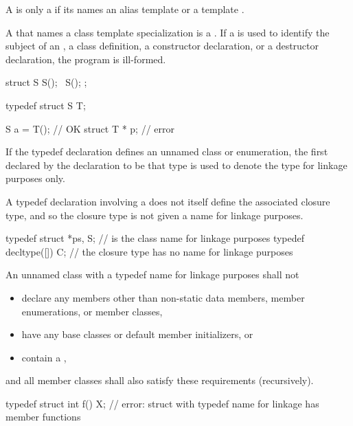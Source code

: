 \pnum
{}%
A  is only a 
if its  names
an alias template or a template .
\begin{note}
A  that names a class template specialization
is a .
If a  is used to identify the subject of an
, a class
definition, a constructor
declaration, or a destructor
declaration, the program is ill-formed.
\end{note}
\begin{example}
\begin{codeblock}
struct S {
  S();
  ~S();
};

typedef struct S T;

S a = T();                      // OK
struct T * p;                   // error
\end{codeblock}
\end{example}

\pnum
{}%
%
%
If the typedef declaration defines an unnamed class or enumeration, the first
 declared by the declaration to be that type
is used to denote the type for linkage purposes only.
\begin{note}
A typedef declaration involving a 
does not itself define the associated closure type,
and so the closure type is not given a name for linkage purposes.
\end{note}
\begin{example}
\begin{codeblock}
typedef struct { } *ps, S;      //  is the class name for linkage purposes
typedef decltype([]{}) C;       // the closure type has no name for linkage purposes
\end{codeblock}
\end{example}

\pnum
An unnamed class with a typedef name for linkage purposes shall not
\begin{itemize}
\item
  declare any members
  other than non-static data members, member enumerations, or member classes,
\item
  have any base classes or default member initializers, or
\item
  contain a ,
\end{itemize}
and all member classes shall also satisfy these requirements (recursively).
\begin{example}
\begin{codeblock}
typedef struct {
  int f() {}
} X;                            // error: struct with typedef name for linkage has member functions
\end{codeblock}
\end{example}


